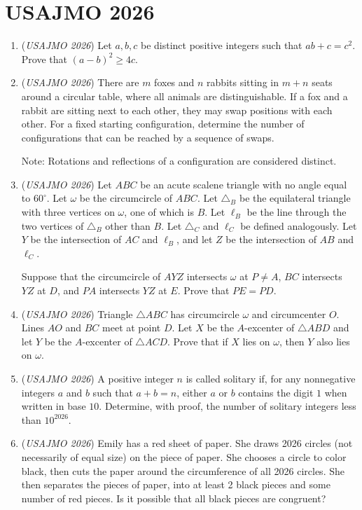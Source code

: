 \section{USAJMO 2026}
        \begin{enumerate}
        	\item (\textit{USAJMO 2026}) Let $a,b,c$ be distinct positive integers such that $ab+c=c^2$. Prove that $(a-b)^2\ge 4c$.


 

	\item (\textit{USAJMO 2026}) There are $m$ foxes and $n$ rabbits sitting in $m+n$ seats around a circular table, where all animals are distinguishable. If a fox and a rabbit are sitting next to each other, they may swap positions with each other. For a fixed starting configuration, determine the number of configurations that can be reached by a sequence of swaps.


 Note: Rotations and reflections of a configuration are considered distinct.


 

	\item (\textit{USAJMO 2026}) Let $ABC$ be an acute scalene triangle with no angle equal to $60^{\circ}$. Let $\omega$ be the circumcircle of $ABC$. Let $\triangle_B$ be the equilateral triangle with three vertices on $\omega$, one of which is $B$. Let $\ell_B$ be the line through the two vertices of $\triangle_B$ other than $B$. Let $\triangle_C$ and $\ell_C$ be defined analogously. Let $Y$ be the intersection of $AC$ and $\ell_B$, and let $Z$ be the intersection of $AB$ and $\ell_C$.


 Suppose that the circumcircle of $AYZ$ intersects $\omega$ at $P\neq A$, $BC$ intersects $YZ$ at $D$, and $PA$ intersects $YZ$ at $E$. Prove that $PE=PD$.


 

	\item (\textit{USAJMO 2026}) Triangle $\triangle{ABC}$ has circumcircle $\omega$ and circumcenter $O$. Lines $AO$ and $BC$ meet at point $D$. Let $X$ be the $A$-excenter of $\triangle{ABD}$ and let $Y$ be the $A$-excenter of $\triangle{ACD}$. Prove that if $X$ lies on $\omega$, then $Y$ also lies on $\omega$.


 

	\item (\textit{USAJMO 2026}) A positive integer $n$ is called solitary if, for any nonnegative integers $a$ and $b$ such that $a+b=n$, either $a$ or $b$ contains the digit $1$ when written in base $10$. Determine, with proof, the number of solitary integers less than $10^{2026}$.


 

	\item (\textit{USAJMO 2026}) Emily has a red sheet of paper. She draws 2026 circles (not necessarily of equal size) on the piece of paper. She chooses a circle to color black, then cuts the paper around the circumference of all 2026 circles. She then separates the pieces of paper, into at least 2 black pieces and some number of red pieces. Is it possible that all black pieces are congruent?


 

\end{enumerate}